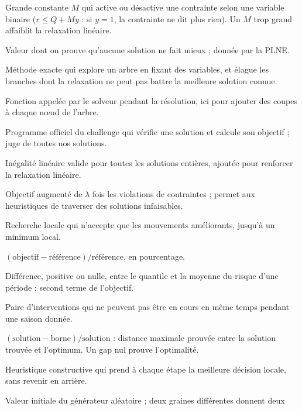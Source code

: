 \documentclass[11pt,a4paper]{report}
\begin{document}
\begin{description}[style=nextline, leftmargin=1.5em, itemsep=0.35em]
  \item[Big-M] Grande constante $M$ qui active ou désactive une contrainte selon une variable binaire
        ($r \le Q + M y$ : si $y = 1$, la contrainte ne dit plus rien). Un $M$ trop grand affaiblit la
        relaxation linéaire.
  \item[Borne inférieure] Valeur dont on prouve qu'aucune solution ne fait mieux ; donnée par la PLNE.
  \item[Branch-and-bound] Méthode exacte qui explore un arbre en fixant des variables, et élague les
        branches dont la relaxation ne peut pas battre la meilleure solution connue.
  \item[Callback] Fonction appelée par le solveur pendant la résolution, ici pour ajouter des coupes
        à chaque nœud de l'arbre.
  \item[Checker] Programme officiel du challenge qui vérifie une solution et calcule son objectif ;
        juge de toutes nos solutions.
  \item[Coupe] Inégalité linéaire valide pour toutes les solutions entières, ajoutée pour renforcer la
        relaxation linéaire.
  \item[Coût pénalisé] Objectif augmenté de $\lambda$ fois les violations de contraintes ; permet aux
        heuristiques de traverser des solutions infaisables.
  \item[Descente] Recherche locale qui n'accepte que les mouvements améliorants, jusqu'à un minimum
        local.
  \item[Écart à la référence] $(\text{objectif} - \text{référence}) / \text{référence}$, en pourcentage.
  \item[Excès] Différence, positive ou nulle, entre le quantile et la moyenne du risque d'une période ;
        second terme de l'objectif.
  \item[Exclusion] Paire d'interventions qui ne peuvent pas être en cours en même temps pendant une
        saison donnée.
  \item[Gap certifié] $(\text{solution} - \text{borne}) / \text{solution}$ : distance maximale prouvée
        entre la solution trouvée et l'optimum. Un gap nul prouve l'optimalité.
  \item[Glouton] Heuristique constructive qui prend à chaque étape la meilleure décision locale, sans
        revenir en arrière.
  \item[Graine] Valeur initiale du générateur aléatoire ; deux graines différentes donnent deux

\end{description}
\end{document}
